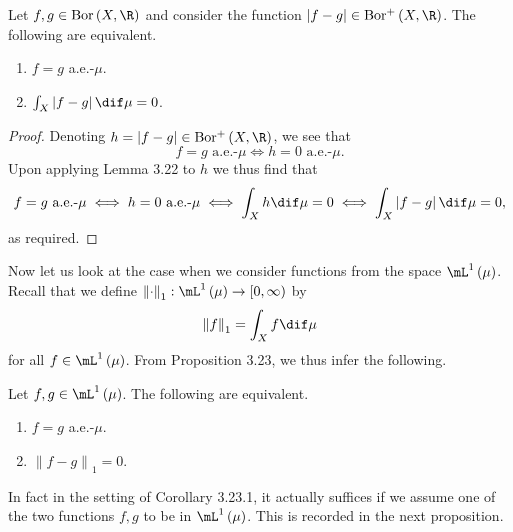 \documentclass[pmath450]{subfiles}
\begin{document}
    \begin{prop}{}
        Let $f,g\in\bor\left( X,\R \right)$ and consider the function $\left| f-g \right|\in\borplus\left( X,\R \right)$. The following are equivalent.
        \begin{enumerate}
            \item $f=g$ a.e.-$\mu$.
            \item $\int_X\left| f-g \right|\dif\mu=0$.
        \end{enumerate}
    \end{prop}

    \begin{proof}
        Denoting $h=\left| f-g \right|\in\borplus\left( X,\R \right)$, we see that
        \begin{equation*}
            f=g\text{ a.e.-$\mu$} \iff h=0\text{ a.e.-$\mu$}.
        \end{equation*}
        Upon applying Lemma 3.22 to $h$ we thus find that
        \begin{equation*}
            f=g\text{ a.e.-$\mu$} \iff h=0\text{ a.e.-$\mu$} \iff \int_Xh\dif\mu = 0 \iff \int_X\left| f-g \right|\dif\mu = 0,
        \end{equation*}
        as required.
    \end{proof}

    \np Now let us look at the case when we consider functions from the space $\lone\left( \mu \right)$. Recall that we define $\left\lVert \cdot \right\rVert_{1}:\lone\left( \mu \right)\to\left[ 0,\infty \right)$ by
    \begin{equation*}
        \left\lVert f \right\rVert_{1} = \int_Xf\dif\mu
    \end{equation*}
    for all $f\in\lone\left( \mu \right)$. From Proposition 3.23, we thus infer the following.

    \begin{cor}{}
        Let $f,g\in\lone\left( \mu \right)$. The following are equivalent.
        \begin{enumerate}
            \item $f=g$ a.e.-$\mu$.
            \item $\left\lVert f-g \right\rVert_{1}=0$.
        \end{enumerate}
    \end{cor}	


    \np In fact in the setting of Corollary 3.23.1, it actually suffices if we assume one of the two functions $f,g$ to be in $\lone\left( \mu \right)$. This is recorded in the next proposition.
\end{document}
